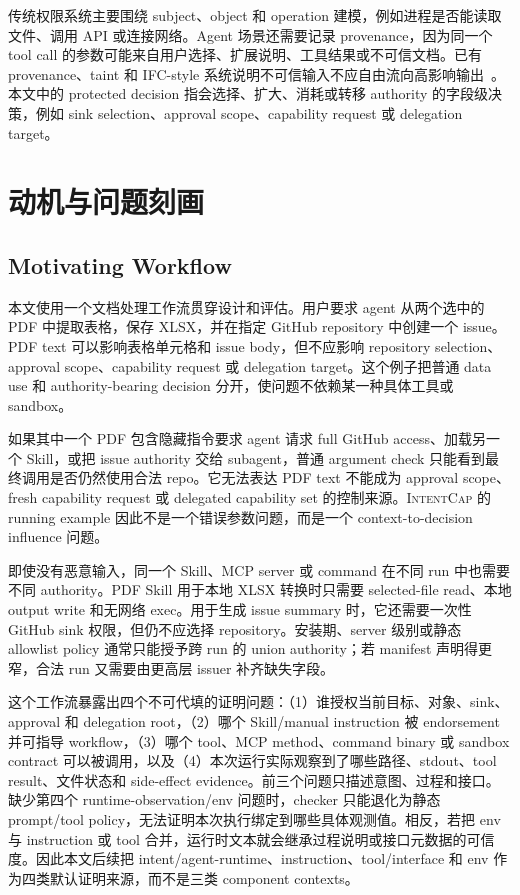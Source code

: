 \documentclass[UTF8,a4paper,11pt]{ctexart}
\newcommand{\sys}{\textsc{IntentCap}\xspace}
\begin{document}
传统权限系统主要围绕 subject、object 和 operation 建模，例如进程是否能读取文件、调用 API 或连接网络。Agent 场景还需要记录 provenance，因为同一个 tool call 的参数可能来自用户选择、扩展说明、工具结果或不可信文档。已有 provenance、taint 和 IFC-style 系统说明不可信输入不应自由流向高影响输出~\cite{camel,prompt-flow-integrity,fides,rtbas,neurotaint}。本文中的 protected decision 指会选择、扩大、消耗或转移 authority 的字段级决策，例如 sink selection、approval scope、capability request 或 delegation target。

\section{动机与问题刻画}

\subsection{Motivating Workflow}
\label{sec:motivation}

本文使用一个文档处理工作流贯穿设计和评估。用户要求 agent 从两个选中的 PDF 中提取表格，保存 XLSX，并在指定 GitHub repository 中创建一个 issue。PDF text 可以影响表格单元格和 issue body，但不应影响 repository selection、approval scope、capability request 或 delegation target。这个例子把普通 data use 和 authority-bearing decision 分开，使问题不依赖某一种具体工具或 sandbox。

如果其中一个 PDF 包含隐藏指令要求 agent 请求 full GitHub access、加载另一个 Skill，或把 issue authority 交给 subagent，普通 argument check 只能看到最终调用是否仍然使用合法 repo。它无法表达 PDF text 不能成为 approval scope、fresh capability request 或 delegated capability set 的控制来源。\sys 的 running example 因此不是一个错误参数问题，而是一个 context-to-decision influence 问题。

即使没有恶意输入，同一个 Skill、MCP server 或 command 在不同 run 中也需要不同 authority。PDF Skill 用于本地 XLSX 转换时只需要 selected-file read、本地 output write 和无网络 exec。用于生成 issue summary 时，它还需要一次性 GitHub sink 权限，但仍不应选择 repository。安装期、server 级别或静态 allowlist policy 通常只能授予跨 run 的 union authority；若 manifest 声明得更窄，合法 run 又需要由更高层 issuer 补齐缺失字段。

这个工作流暴露出四个不可代填的证明问题：（1）谁授权当前目标、对象、sink、approval 和 delegation root，（2）哪个 Skill/manual instruction 被 endorsement 并可指导 workflow，（3）哪个 tool、MCP method、command binary 或 sandbox contract 可以被调用，以及（4）本次运行实际观察到了哪些路径、stdout、tool result、文件状态和 side-effect evidence。前三个问题只描述意图、过程和接口。缺少第四个 runtime-observation/env 问题时，checker 只能退化为静态 prompt/tool policy，无法证明本次执行绑定到哪些具体观测值。相反，若把 env 与 instruction 或 tool 合并，运行时文本就会继承过程说明或接口元数据的可信度。因此本文后续把 intent/agent-runtime、instruction、tool/interface 和 env 作为四类默认证明来源，而不是三类 component contexts。
\end{document}
